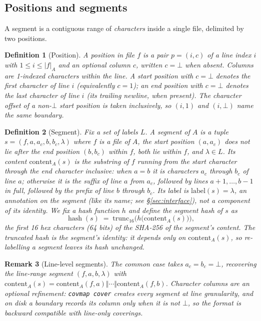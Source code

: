\documentclass[11pt,a4paper]{article}
\newtheorem{definition}{Definition}[section]
\newtheorem{remark}[definition]{Remark}
\DeclareMathOperator{\hash}{hash}
\begin{document}
\subsection{Positions and segments}

A segment is a contiguous range of \emph{characters} inside a single
file, delimited by two positions.

\begin{definition}[Position]\label{def:position}
A \emph{position} in file $f$ is a pair $p = (i, c)$ of a line index
$i$ with $1 \le i \le |f|_A$ and an optional column $c$, written
$c = \bot$ when absent. Columns are 1-indexed characters within the
line. A start position with $c = \bot$ denotes the first character of
line $i$ (equivalently $c = 1$); an end position with $c = \bot$
denotes the last character of line $i$ (its trailing newline, when
present). The character offset of a non-$\bot$ start position is taken
inclusively, so $(i, 1)$ and $(i, \bot)$ name the same boundary.
\end{definition}

\begin{definition}[Segment]\label{def:segment}
Fix a set of \emph{labels} $L$. A \emph{segment} of $A$ is a tuple
$s = (f, a, a_c, b, b_c, \lambda)$ where $f$ is a file of $A$, the
start position $(a, a_c)$ does not lie after the end position
$(b, b_c)$ within $f$, both lie within $f$, and $\lambda \in L$. Its
\emph{content} $\mathrm{content}_A(s)$ is the substring of $f$ running
from the start character through the end character inclusive: when
$a = b$ it is characters $a_c$ through $b_c$ of line $a$; otherwise it
is the suffix of line $a$ from $a_c$, followed by lines $a+1, \dots,
b-1$ in full, followed by the prefix of line $b$ through $b_c$. Its
\emph{label} is $\mathrm{label}(s) = \lambda$, an \emph{annotation} on the
segment (like its name; see \S\ref{sec:interface}), not a component of its
identity. We fix a hash function $h$ and define the \emph{segment hash} of
$s$ as
\[
  \hash(s) \;=\; \mathrm{trunc}_{16}\bigl(h\bigl(\mathrm{content}_A(s)\bigr)\bigr),
\]
the first 16 hex characters (64 bits) of the SHA-256 of the segment's
content. The truncated hash is the segment's identity: it depends only on
$\mathrm{content}_A(s)$, so re-labelling a segment leaves its hash
unchanged.
\end{definition}

\begin{remark}[Line-level segments]\label{rem:line-level}
The common case takes $a_c = b_c = \bot$, recovering the line-range
segment $(f, a, b, \lambda)$ with
$\mathrm{content}_A(s) = \mathrm{content}_A(f,a) \Vert \cdots \Vert
\mathrm{content}_A(f,b)$. Character columns are an optional
refinement: \texttt{covmap cover} creates every segment at line
granularity, and on disk a boundary records its column only when it is
not $\bot$, so the format is backward compatible with line-only
coverings.
\end{remark}
\end{document}
